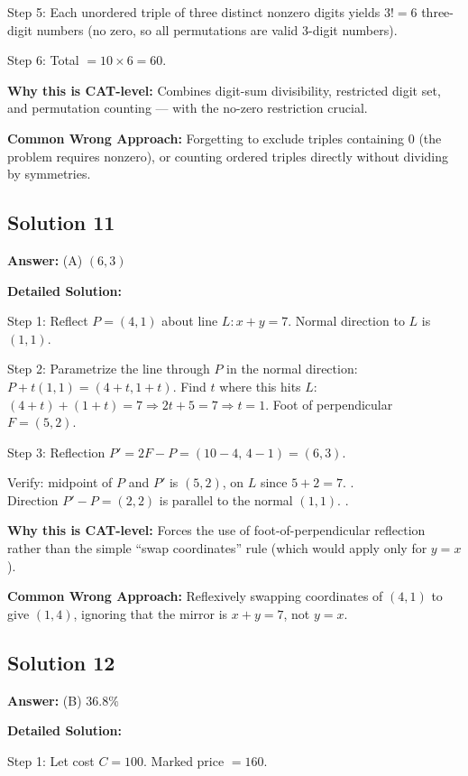 \documentclass[11pt]{article}
\begin{document}
Step 5: Each unordered triple of three distinct nonzero digits yields \(3! = 6\) three-digit numbers (no zero, so all permutations are valid 3-digit numbers).

Step 6: Total \(= 10 \times 6 = 60\).

\textbf{Why this is CAT-level:}
Combines digit-sum divisibility, restricted digit set, and permutation counting — with the no-zero restriction crucial.

\textbf{Common Wrong Approach:}
Forgetting to exclude triples containing 0 (the problem requires nonzero), or counting ordered triples directly without dividing by symmetries.

\subsection*{Solution 11}
\textbf{Answer:} (A) \((6, 3)\)

\textbf{Detailed Solution:}

Step 1: Reflect \(P=(4,1)\) about line \(L: x+y=7\). Normal direction to \(L\) is \((1,1)\).

Step 2: Parametrize the line through \(P\) in the normal direction: \(P + t(1,1) = (4+t, 1+t)\). Find \(t\) where this hits \(L\): \((4+t)+(1+t) = 7 \Rightarrow 2t + 5 = 7 \Rightarrow t = 1\). Foot of perpendicular \(F = (5, 2)\).

Step 3: Reflection \(P' = 2F - P = (10 - 4,\, 4 - 1) = (6, 3)\).

Verify: midpoint of \(P\) and \(P'\) is \((5,2)\), on \(L\) since \(5+2=7\). \checkmark.\\
Direction \(P' - P = (2, 2)\) is parallel to the normal \((1,1)\). \checkmark.

\textbf{Why this is CAT-level:}
Forces the use of foot-of-perpendicular reflection rather than the simple ``swap coordinates'' rule (which would apply only for \(y = x\)).

\textbf{Common Wrong Approach:}
Reflexively swapping coordinates of \((4,1)\) to give \((1,4)\), ignoring that the mirror is \(x+y=7\), not \(y=x\).

\subsection*{Solution 12}
\textbf{Answer:} (B) \(36.8\%\)

\textbf{Detailed Solution:}

Step 1: Let cost \(C = 100\). Marked price \(= 160\).
\end{document}
